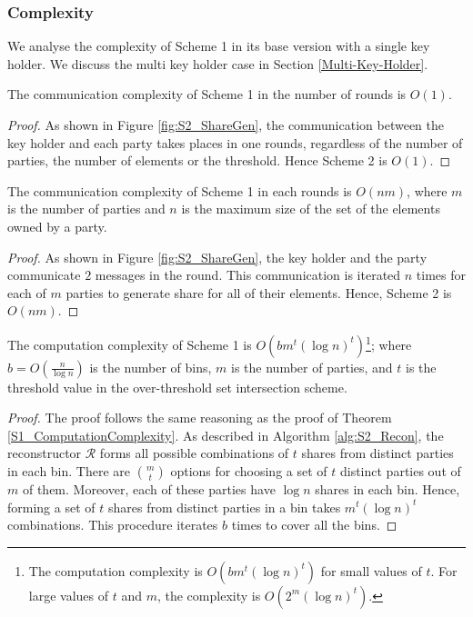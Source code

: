 \subsubsection{Complexity}
We analyse the complexity of Scheme 1 in its base version with a single key holder. We discuss the multi key holder case in Section \ref{Multi-Key-Holder}.
\begin{theorem}
The communication complexity of Scheme 1 in the number of rounds is $O(1)$. 
\end{theorem}
\begin{proof}
As shown in Figure \ref{fig:S2_ShareGen}, the communication between the key holder and each party takes places in one rounds, regardless of the number of parties, the number of elements or the threshold. Hence Scheme 2 is $O(1)$. 
\end{proof}
\begin{theorem}
The communication complexity of Scheme 1 in each rounds is $O(nm)$, where $m$ is the number of parties and $n$ is the maximum size of the set of the elements owned by a party. 
\end{theorem}
\begin{proof}
As shown in Figure \ref{fig:S2_ShareGen}, the key holder and the party communicate $2$ messages in the round. This communication is iterated $n$ times for each of $m$ parties to generate share for all of their elements. Hence, Scheme 2 is $O(nm)$.  
\end{proof}
\begin{theorem}
The computation complexity of Scheme 1 is $O(b m^t (\log{n})^t)$\footnote{The computation complexity is $O(b m^t (\log{n})^t)$ for small values of $t$. For large values of $t$ and $m$, the complexity is $O(2^m (\log{n})^t)$.}; where $b = O(\frac{n}{\log{n}})$ is the number of bins, $m$ is the number of parties, and $t$ is the threshold value in the over-threshold set intersection scheme. 
\end{theorem}
\begin{proof}
The proof follows the same reasoning as the proof of Theorem \ref{S1_ComputationComplexity}. 
As described in Algorithm \ref{alg:S2_Recon}, the reconstructor $\mathcal{R}$ forms all possible combinations of $t$ shares from distinct parties in each bin. There are $m \choose t$ options for choosing a set of $t$ distinct parties out of $m$ of them. Moreover, each of these parties have $\log{n}$ shares in each bin. Hence, forming a set of $t$ shares from distinct parties in a bin takes $m^t (\log{n})^t$ combinations. This procedure iterates $b$ times to cover all the bins.  
\end{proof}

